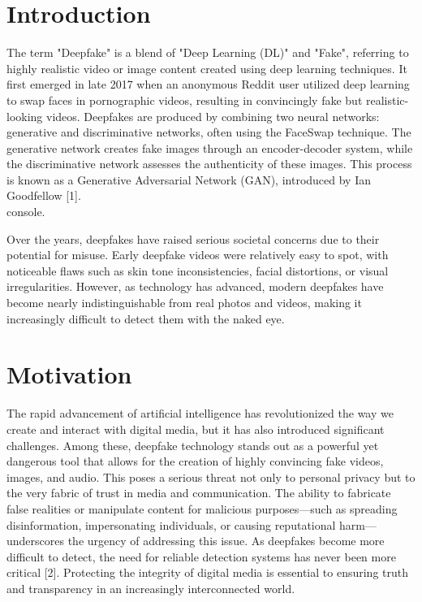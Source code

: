 \documentclass[conference]{IEEEtran}
\begin{document}
    
    \section{Introduction}
    
        The term "Deepfake" is a blend of "Deep Learning (DL)" and "Fake", referring to highly realistic video or image content created using deep learning techniques. It first emerged in late 2017 when an anonymous Reddit user utilized deep learning to swap faces in pornographic videos, resulting in convincingly fake but realistic-looking videos. Deepfakes are produced by combining two neural networks: generative and discriminative networks, often using the FaceSwap technique. The generative network creates fake images through an encoder-decoder system, while the discriminative network assesses the authenticity of these images. This process is known as a Generative Adversarial Network (GAN), introduced by Ian Goodfellow [1]. \\
    console.
    
        Over the years, deepfakes have raised serious societal concerns due to their potential for misuse. Early deepfake videos were relatively easy to spot, with noticeable flaws such as skin tone inconsistencies, facial distortions, or visual irregularities. However, as technology has advanced, modern deepfakes have become nearly indistinguishable from real photos and videos, making it increasingly difficult to detect them with the naked eye.
    
    \section{Motivation}
    
        The rapid advancement of artificial intelligence has revolutionized the way we create and interact with digital media, but it has also introduced significant challenges. Among these, deepfake technology stands out as a powerful yet dangerous tool that allows for the creation of highly convincing fake videos, images, and audio. This poses a serious threat not only to personal privacy but to the very fabric of trust in media and communication. The ability to fabricate false realities or manipulate content for malicious purposes—such as spreading disinformation, impersonating individuals, or causing reputational harm—underscores the urgency of addressing this issue. As deepfakes become more difficult to detect, the need for reliable detection systems has never been more critical [2]. Protecting the integrity of digital media is essential to ensuring truth and transparency in an increasingly interconnected world. 
\end{document}
